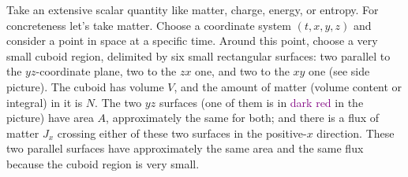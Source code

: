 \documentclass[a4paper,12pt,%
onecolumn,oneside,titlepage,%
british%
]{memoir}
\renewcommand*{\|}[1][]{\nonscript\:#1\vert\nonscript\:\mathopen{}}
\newcommand*{\yN}{N}
\newcommand*{\yJ}{J}
\begin{document}
Take an extensive scalar quantity like matter, charge, energy, or entropy. For concreteness let's take matter. Choose a coordinate system $(t,x,y,z)$ and consider a point in space at a specific time.
%
%
Around this point, choose a very small cuboid region, delimited by six small rectangular surfaces: two parallel to the $yz$-coordinate plane, two to the $zx$ one, and two to the $xy$ one (see side picture). The cuboid has volume $V$, and the amount of matter (volume content or integral) in it is $\yN$. The two $yz$ surfaces (one of them is in \textcolor{purple}{dark red} in the picture) have area $A$, approximately the same for both; and there is a flux of matter $\yJ_{x}$ crossing either of these two surfaces in the positive-$x$ direction. These two parallel surfaces have approximately the same area and the same flux because the cuboid region is very small.
\end{document}
